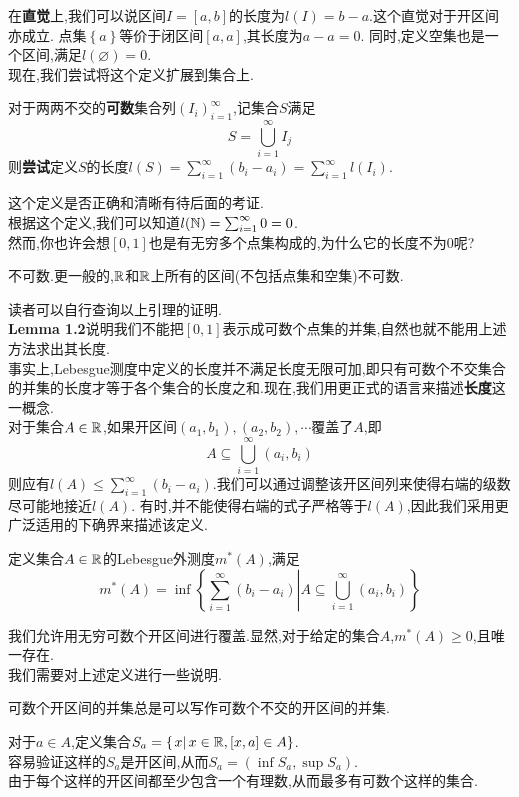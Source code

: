 \documentclass[a4paper]{ctexart}
\begin{document}
在\textbf{\songti 直觉}上,我们可以说区间$I=[a,b]$的长度为$l(I)=b-a$.这个直觉对于开区间亦成立.
点集$\left\{a\right\}$等价于闭区间$[a,a]$,其长度为$a-a=0$.
同时,定义空集也是一个区间,满足$l(\varnothing)=0$.\\
现在,我们尝试将这个定义扩展到集合上.
\begin{formal}[Definition 1.1]
    对于两两不交的\textbf{\songti 可数}集合列$(I_i)_{i=1}^{\infty}$,记集合$S$满足
    $$S=\bigcup_{i=1}^{\infty}I_j$$
    则\textbf{\songti 尝试}定义$S$的长度$\displaystyle l(S)=\sum_{i=1}^{\infty}\left(b_i-a_i\right)=\sum_{i=1}^{\infty}l(I_i)$.
\end{formal}\noindent
这个定义是否正确和清晰有待后面的考证.\\
根据这个定义,我们可以知道$l(\mathbb{N})=\sum_{i=1}^{\infty}0=0$.\\
然而,你也许会想$[0,1]$也是有无穷多个点集构成的,为什么它的长度不为$0$呢?
\begin{theorem}[Lemma 1.2]
    [0,1]不可数.更一般的,$\mathbb{R}$和$\mathbb{R}$上所有的区间(不包括点集和空集)不可数.
\end{theorem}\noindent
读者可以自行查询以上引理的证明.\\
\textbf{Lemma 1.2}说明我们不能把$[0,1]$表示成可数个点集的并集,自然也就不能用上述方法求出其长度.\\
事实上,Lebesgue测度中定义的长度并不满足长度无限可加,即只有可数个不交集合的并集的长度才等于各个集合的长度之和.现在,我们用更正式的语言来描述\textbf{\songti 长度}这一概念.\\
对于集合$A\in\mathbb{R}$,如果开区间$(a_1,b_1),(a_2,b_2),\cdots$覆盖了$A$,即$$A\subseteq \bigcup_{i=1}^{\infty}(a_i,b_i)$$
则应有$\displaystyle l(A)\leqslant\sum_{i=1}^\infty(b_i-a_i)$.我们可以通过调整该开区间列来使得右端的级数尽可能地接近$l(A)$.
有时,并不能使得右端的式子严格等于$l(A)$,因此我们采用更广泛适用的下确界来描述该定义.
\begin{formal}
    定义集合$A\in\mathbb{R}$的Lebesgue外测度$m^*(A)$,满足
    $$m^*(A)=\inf\left\{\left.\sum_{i=1}^{\infty}(b_i-a_i)\right|A\subseteq \bigcup_{i=1}^{\infty}(a_i,b_i)\right\}$$
\end{formal}\noindent
我们允许用无穷可数个开区间进行覆盖.显然,对于给定的集合$A$,$m^*(A)\geqslant 0$,且唯一存在.\\
我们需要对上述定义进行一些说明.
\begin{theorem}[Lemma 1.3.1]
    可数个开区间的并集总是可以写作可数个不交的开区间的并集.
\end{theorem}
\begin{solution}[Proof.]
    对于$a\in A$,定义集合$\displaystyle S_a=\left\{\left.x\right|x\in\mathbb{R},[x,a]\in A\right\}$.\\
    容易验证这样的$S_a$是开区间,从而$S_a=(\inf{S_a},\sup{S_a})$.\\
    由于每个这样的开区间都至少包含一个有理数,从而最多有可数个这样的集合.
\end{solution}
\end{document}

